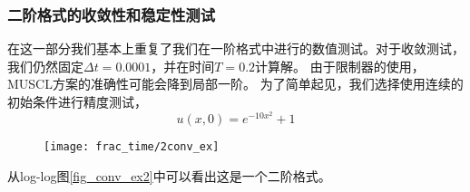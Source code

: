 \subsubsection{二阶格式的收敛性和稳定性测试}	
在这一部分我们基本上重复了我们在一阶格式中进行的数值测试。对于收敛测试，我们仍然固定$ \Delta t = 0.0001 $，并在时间$ T = 0.2 $计算解。 由于限制器的使用，MUSCL方案的准确性可能会降到局部一阶。 为了简单起见，我们选择使用连续的初始条件进行精度测试，
\begin{equation}
u(x, 0) = e^{-10 x^2} + 1
\end{equation}
\begin{figure}[htbp]
	\centering
	\texttt{[image: frac\_time/2conv\_ex]}
\end{figure}
从log-log图\ref{fig_conv_ex2}中可以看出这是一个二阶格式。

